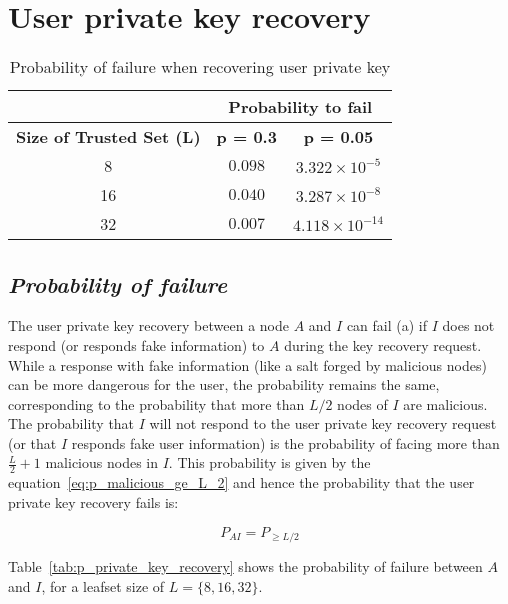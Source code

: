\section{User private key recovery}
\label{sec:eval_private_key_recovery}
  \begin{table}
    \centering
    \footnotesize
    \begin{tabular}{|c|c|c|}
      \cline{2-3}
      \multicolumn{1}{c|}{}&  \multicolumn{2}{c|}{\textbf{Probability to fail}} \\ \cline{2-3}
      \hline
      \textbf{Size of Trusted Set (L)} & \textbf{p = 0.3} & \textbf{p = 0.05} \\
      \hline \hline
      8 &  $0.098$ & $3.322 \times 10^{-5}$ \\
      \hline
      16 & $0.040$ & $3.287 \times 10^{-8}$  \\
      \hline
      32 & $0.007$ & $4.118 \times 10^{-14}$  \\
      \hline
    \end{tabular}
    \caption{Probability of failure when recovering user private key}
    \label{tab:p_private_key_recovery}
  \end{table}

  \subsection{\textit{Probability of failure}}

    The user private key recovery between a node $A$ and $I$ can fail (a) if $I$ does
not respond (or responds fake information) to $A$ during the key recovery
request. While a response with fake information (like a salt forged by malicious nodes) can be more dangerous for the
user, the probability remains the same, corresponding to the
probability that more than $L/2$ nodes of $I$ are malicious.\\
    The probability that $I$ will not respond to the user private key recovery
request (or that $I$ responds fake user information) is the probability of
facing more than $\frac{L}{2} +1$ malicious nodes in $I$. This probability is given by the
equation~\ref{eq:p_malicious_ge_L_2} and hence the probability that the user
private key recovery fails is:

\begin{equation} \label{eq:L_2_malicious_A_I}
 P_{AI} = P_{\ge L/2}
\end{equation}

    Table~\eqref{tab:p_private_key_recovery} shows the probability of failure
between $A$ and $I$, for a leafset size of $L = \{8,16,32\}$.

